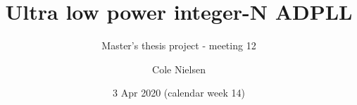 \documentclass[t, screen, aspectratio=43]{beamer}
\title[Short title]{Ultra low power integer-N ADPLL}
\subtitle{Master's thesis project - meeting 12}
\author[C Nielsen]{Cole Nielsen}
\institute[NTNU]{Department of Electronic Systems, NTNU}
\date{3 Apr 2020  (calendar week 14)}
\newcommand*\mycirc[1]{%
\begin{tikzpicture}[baseline=(C.base)]
	\node[draw,circle,inner sep=1pt,minimum size=3ex](C){#1};
\end{tikzpicture}}
\begin{document}
\begin{frame}
	\titlepage%
\end{frame}










\end{document}

